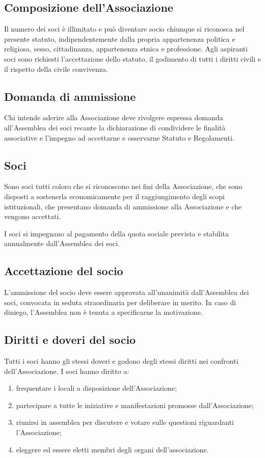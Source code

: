 \documentclass[a4paper,11pt,oneside]{article}
\begin{document}
\subsection{Composizione dell'Associazione}
Il numero dei soci è illimitato e può diventare socio chiunque si riconosca nel presente statuto, indipendentemente dalla propria appartenenza politica e religiosa,
sesso, cittadinanza, appartenenza etnica e professione. Agli aspiranti soci sono richiesti l'accettazione dello statuto, il godimento di tutti i diritti civili e il rispetto della civile convivenza.

\subsection{Domanda di ammissione}
Chi intende aderire alla Associazione deve rivolgere espressa domanda all'Assemblea dei soci recante la dichiarazione di condividere le finalità associative e l'impegno ad accettarne e osservarne Statuto e Regolamenti.

\subsection{Soci}
Sono soci tutti coloro che si riconoscono nei fini della Associazione, che sono disposti a sostenerla economicamente per il raggiungimento degli scopi istituzionali, che presentano domanda di ammissione alla Associazione e che vengono accettati.

I soci si impegnano al pagamento della quota sociale prevista e stabilita annualmente dall'Assemblea dei soci.

\subsection{Accettazione del socio}
L'ammissione del socio deve essere approvata all'unanimità dall'Assemblea dei soci, convocata in seduta straordinaria per deliberare in merito. In  caso di diniego, l'Assemblea non è tenuta a specificarne la motivazione.

\subsection{Diritti e doveri del socio}
Tutti i soci hanno gli stessi doveri e godono degli stessi diritti nei confronti dell'Associazione. I soci hanno diritto a:

\begin{enumerate}
\item  frequentare i locali a disposizione dell'Associazione;
\item  partecipare a tutte le iniziative e manifestazioni promosse dall'Associazione;
\item  riunirsi in assemblea per discutere e votare sulle questioni riguardanti l'Associazione; 
\item  eleggere ed essere eletti membri degli organi dell'associazione. 
\end{enumerate}
\end{document}
